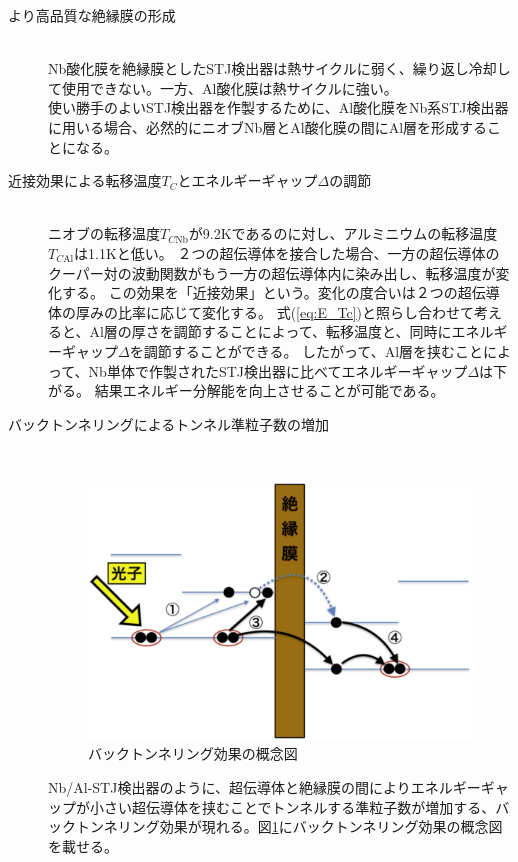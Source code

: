 		\begin{description}
			\item[より高品質な絶縁膜の形成]\mbox{}\\
				Nb酸化膜を絶縁膜としたSTJ検出器は熱サイクルに弱く、繰り返し冷却して使用できない。一方、Al酸化膜は熱サイクルに強い。\\
				使い勝手のよいSTJ検出器を作製するために、Al酸化膜をNb系STJ検出器に用いる場合、必然的にニオブNb層とAl酸化膜の間にAl層を形成することになる。
			\item[近接効果による転移温度$T_C$とエネルギーギャップ$\Delta$の調節]\mbox{}\\
				ニオブの転移温度$T_{C\mathrm{Nb}}$が9.2Kであるのに対し、アルミニウムの転移温度$T_{C\mathrm{Al}}$は1.1Kと低い。
				２つの超伝導体を接合した場合、一方の超伝導体のクーパー対の波動関数がもう一方の超伝導体内に染み出し、転移温度が変化する。
				この効果を「近接効果」という。変化の度合いは２つの超伝導体の厚みの比率に応じて変化する。
				式(\ref{eq:E_Tc})と照らし合わせて考えると、Al層の厚さを調節することによって、転移温度と、同時にエネルギーギャップ$\Delta$を調節することができる。
				したがって、Al層を挟むことによって、Nb単体で作製されたSTJ検出器に比べてエネルギーギャップ$\Delta$は下がる。
				結果エネルギー分解能を向上させることが可能である。
			\item[バックトンネリングによるトンネル準粒子数の増加]\mbox{}\\
				\begin{figure}[htbp]
  					\begin{center}
    						\includegraphics[width=12.0cm]{./Chapter/Chapter2/Picture/NbAlSTJ_backtunnel.eps}
    						\caption{バックトンネリング効果の概念図}
	  					\label{fig:NbAlSTJ_backtunnel}
  					\end{center}
				\end{figure}
				Nb/Al-STJ検出器のように、超伝導体と絶縁膜の間によりエネルギーギャップが小さい超伝導体を挟むことでトンネルする準粒子数が増加する、バックトンネリング効果が現れる。図\ref{fig:NbAlSTJ_backtunnel}にバックトンネリング効果の概念図を載せる。
				

\end{description}
